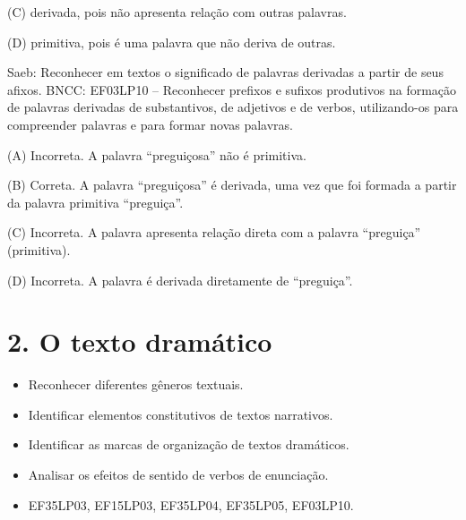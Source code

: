 (C) derivada, pois não apresenta relação com outras palavras.

(D) primitiva, pois é uma palavra que não deriva de outras.

Saeb: Reconhecer em textos o significado de palavras derivadas a partir de seus afixos.
BNCC: EF03LP10 -- Reconhecer prefixos e sufixos produtivos na formação de
palavras derivadas de substantivos, de adjetivos e de verbos,
utilizando-os para compreender palavras e para formar novas palavras.

(A) Incorreta. A palavra ``preguiçosa'' não é primitiva.

(B) Correta. A palavra ``preguiçosa'' é derivada, uma vez que foi
formada a partir da palavra primitiva ``preguiça''.

(C) Incorreta. A palavra apresenta relação direta com a palavra
``preguiça'' (primitiva).

(D) Incorreta. A palavra é derivada diretamente de ``preguiça''.

\section{2. O texto dramático}\label{muxf3dulo-2}



\begin{itemize}
  \item Reconhecer diferentes gêneros textuais.
  \item Identificar elementos constitutivos de textos narrativos.
  \item Identificar as marcas de organização de textos dramáticos.
  \item Analisar os efeitos de sentido de verbos de enunciação.
\end{itemize}


\begin{itemize}
  \item EF35LP03, EF15LP03, EF35LP04, EF35LP05, EF03LP10.
\end{itemize}

